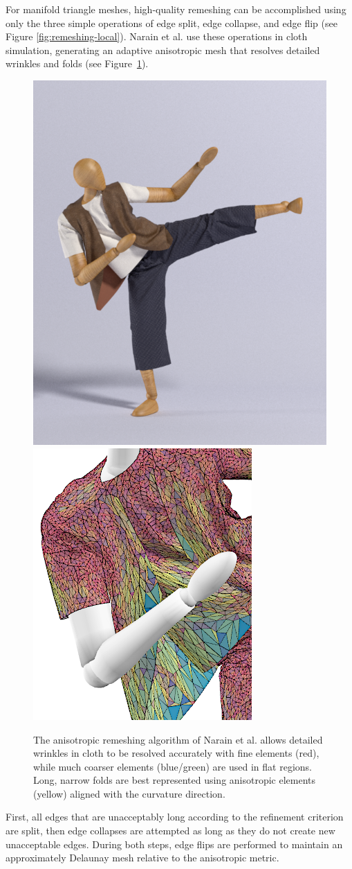 For manifold triangle meshes, high-quality remeshing can be accomplished using only the three simple operations of edge split, edge collapse, and edge flip (see Figure \ref{fig:remeshing-local}).
Narain et al. \cite{Narain2012} use these operations in cloth simulation, generating an adaptive anisotropic mesh that resolves detailed wrinkles and folds (see Figure~\ref{fig:Narain2012}).
\begin{figure}[!h]
	\centering
	\includegraphics[width=0.35\linewidth]{images/starAdaptivity-cgf2016/cloth-render.png}
	\includegraphics[width=0.35\linewidth]{images/starAdaptivity-cgf2016/cloth-wire-zoom.png}
	\caption[STAR adaptivity: Anisotropic remeshing of triangular meshes]{The anisotropic remeshing algorithm of Narain et al. \cite{Narain2012} allows detailed wrinkles in cloth to be resolved accurately with fine elements (red), while much coarser elements (blue/green) are used in flat regions. Long, narrow folds are best represented using anisotropic elements (yellow) aligned with the curvature direction.}
	\label{fig:Narain2012}
\end{figure}
First, all edges that are unacceptably long according to the refinement criterion are split, then edge collapses are attempted as long as they do not create new unacceptable edges.
During both steps, edge flips are performed to maintain an approximately Delaunay mesh relative to the anisotropic metric.

